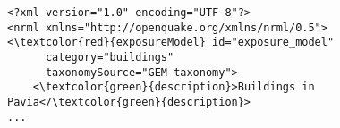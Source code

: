 \begin{Verbatim}[frame=single, commandchars=\\\{\}, samepage=false]
<?xml version="1.0" encoding="UTF-8"?>
<nrml xmlns="http://openquake.org/xmlns/nrml/0.5">
<\textcolor{red}{exposureModel} id="exposure_model"
      category="buildings"
      taxonomySource="GEM taxonomy">
    <\textcolor{green}{description}>Buildings in Pavia</\textcolor{green}{description}>
...
\end{Verbatim}